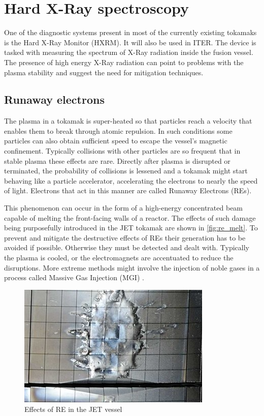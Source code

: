 \section{Hard X-Ray spectroscopy}

One of the diagnostic systems present in most of the currently existing tokamaks
is the Hard X-Ray Monitor (HXRM). It will also be used in ITER.
The device is tasked with measuring the spectrum of X-Ray radiation
inside the fusion vessel. The presence of high energy X-Ray
radiation can point to problems with the plasma stability and suggest the 
need for mitigation techniques.
\cite{low_noise_amplifier_for_pmt}

\subsection{Runaway electrons}

The plasma in a tokamak is super-heated so that particles reach a velocity
that enables them to break through atomic repulsion. In such conditions some 
particles can also obtain sufficient speed to escape the vessel's magnetic confinement.
Typically collisions with other particles are so frequent
that in stable plasma these effects are rare.
Directly after plasma is disrupted or terminated, 
the probability of collisions is lessened 
and a tokamak might start behaving like a particle accelerator,
accelerating the electrons to nearly the speed of light.
Electrons that act in this manner are called Runaway Electrons (REs).
\cite{iter_re_melt}

This phenomenon can occur in the form of a high-energy 
concentrated beam capable of melting the front-facing walls of a reactor.
The effects of such damage being purposefully introduced in the JET tokamak
are shown in \autoref{fig:re_melt}. To prevent and mitigate the destructive
effects of REs their generation has to be avoided if possible. Otherwise
they must be detected and dealt with. Typically the plasma 
is cooled, or the electromagnets are accentuated
to reduce the disruptions. More extreme methods might 
involve the injection of noble gases in a process called 
Massive Gas Injection (MGI) \cite{massive_gas_injection}.
\begin{figure}[H]
  \centering
  \includegraphics[width=.7\linewidth]{media/re_melt.jpeg}
  \caption{Effects of RE in the JET vessel \cite{iter_re_melt}}
  \label{fig:re_melt}
\end{figure}


